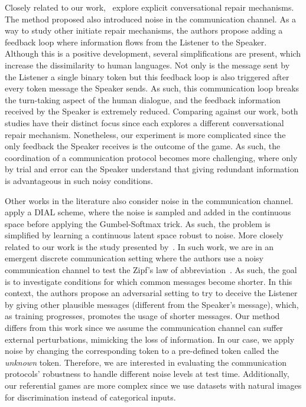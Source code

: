 Closely related to our work,~\citet{nikolaus2023emergent} explore explicit conversational repair mechanisms. The method proposed also introduced noise in the communication channel. As a way to study other initiate repair mechanisms, the authors propose adding a feedback loop where information flows from the Listener to the Speaker. Although this is a positive development, several simplifications are present, which increase the dissimilarity to human languages. Not only is the message sent by the Listener a single binary token but this feedback loop is also triggered after every token message the Speaker sends. As such, this communication loop breaks the turn-taking aspect of the human dialogue, and the feedback information received by the Speaker is extremely reduced. Comparing against our work, both studies have their distinct focus since each explores a different conversational repair mechanism. Nonetheless, our experiment is more complicated since the only feedback the Speaker receives is the outcome of the game. As such, the coordination of a communication protocol becomes more challenging, where only by trial and error can the Speaker understand that giving redundant information is advantageous in such noisy conditions.

Other works in the literature also consider noise in the communication channel. \citet{tucker2021emergent,kucinski2021catalytic} apply a DIAL scheme, where the noise is sampled and added in the continuous space before applying the Gumbel-Softmax trick. As such, the problem is simplified by learning a continuous latent space robust to noise. More closely related to our work is the study presented by~\citet{ueda-washio-2021-relationship}. In such work, we are in an emergent discrete communication setting where the authors use a noisy communication channel to test the Zipf's law of abbreviation~\citep{zipf2013psycho}. As such, the goal is to investigate conditions for which common messages become shorter. In this context, the authors propose an adversarial setting to try to deceive the Listener by giving other plausible messages (different from the Speaker's message), which, as training progresses, promotes the usage of shorter messages. Our method differs from this work since we assume the communication channel can suffer external perturbations, mimicking the loss of information. In our case, we apply noise by changing the corresponding token to a pre-defined token called the \textit{unknown} token. Therefore, we are interested in evaluating the communication protocols' robustness to handle different noise levels at test time. Additionally, our referential games are more complex since we use datasets with natural images for discrimination instead of categorical inputs.